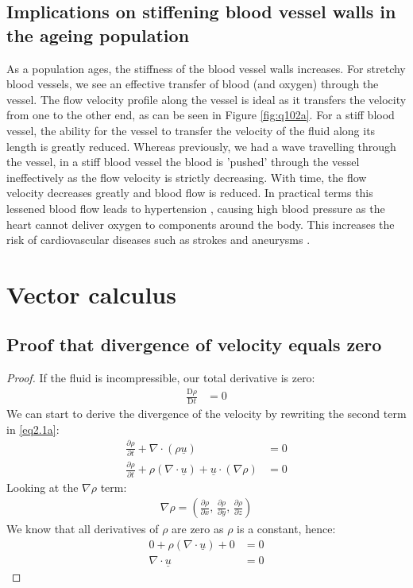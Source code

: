 \documentclass[11pt]{article}
\numberwithin{equation}{section}
\begin{document}
\subsection{Implications on stiffening blood vessel walls in the ageing population}
As a population ages, the stiffness of the blood vessel walls increases. For stretchy blood vessels, we see an effective transfer of blood (and oxygen) through the vessel. The flow velocity profile along the vessel is ideal as it transfers the velocity from one to the other end, as can be seen in Figure \ref{fig:q102a}. For a stiff blood vessel, the ability for the vessel to transfer the velocity of the fluid along its length is greatly reduced. Whereas previously, we had a wave travelling through the vessel, in a stiff blood vessel the blood is 'pushed' through the vessel ineffectively as the flow velocity is strictly decreasing. With time, the flow velocity decreases greatly and blood flow is reduced. In practical terms this lessened blood flow leads to hypertension \cite{q1.6.1}, causing high blood pressure as the heart cannot deliver oxygen to components around the body. This increases the risk of cardiovascular diseases such as strokes and aneurysms \cite{q1.6.2}.
\section{Vector calculus}
\subsection{Proof that divergence of velocity equals zero}
\begin{proof}
If the fluid is incompressible, our total derivative is zero:
\begin{align}
    \frac{\textrm{D}\rho}{\textrm{D}t} &= 0
\end{align}
We can start to derive the divergence of the velocity by rewriting the second term in \ref{eq2.1a}:
\begin{align}
    \frac{\partial \rho}{\partial t} + \nabla \cdot \left(\rho \underline{u}\right) &= 0 \label{eq2.1a}\\ 
    \frac{\partial \rho}{\partial t} + \rho \left(\nabla \cdot \underline{u}\right) + \underline{u} \cdot \left(\nabla \rho\right) &= 0
\end{align}
Looking at the $\nabla \rho$ term:
\begin{align}
    \nabla \rho = \left(\frac{\partial \rho}{\partial x}, \, \frac{\partial \rho}{\partial y}, \, \frac{\partial \rho}{\partial z}\right)
\end{align}
We know that all derivatives of $\rho$ are zero as $\rho$ is a constant, hence:
\begin{align}
    0 + \rho \left(\nabla \cdot \underline{u}\right) + 0 &= 0\\
    \nabla \cdot \underline{u} &= 0
\end{align}
\end{proof}
\end{document}
